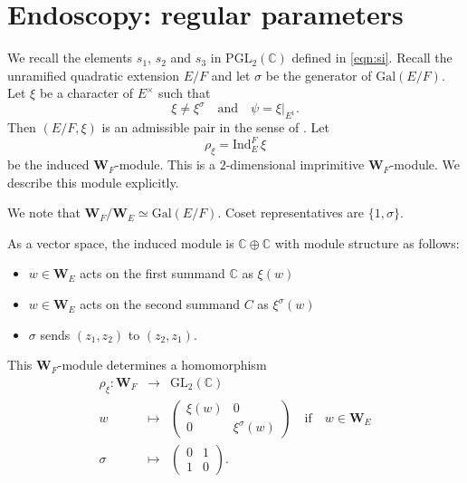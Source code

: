 \documentclass[11pt]{amsart}
\numberwithin{equation}{section}
\def\Gal{\mathrm{Gal}}
\def\Ind{\mathrm{Ind}}
\def\PGL{\mathrm{PGL}}
\def\GL{\mathrm{GL}}
\def\C{\mathbb{C}}
\def\W{\mathbf{W}}
\newcommand{\<}{\left\langle}
\renewcommand{\>}{\right\rangle}
\begin{document}
  
\section{Endoscopy: regular parameters}  
 We recall the elements $s_1$, $s_2$ and $s_3$ in $\PGL_2(\C)$ defined in \eqref{eqn:si}.
Recall the unramified quadratic extension  $E/F$ and  
let $\sigma$ be the generator of $\Gal(E/F)$.  Let $\xi$ be a character of $E^\times$ such that 
\[
\xi \neq \xi^\sigma \quad \textrm{and} \quad \psi = \xi|_{E^1}.
\] 
Then $(E/F, \xi)$ is an admissible pair in the sense of \cite[\S18]{BH}.   Let 
\[
\rho_\xi = \Ind_E^F \, \xi
\]
be the induced $\W_F$-module.   This is a $2$-dimensional imprimitive $\W_F$-module.    We describe this module explicitly.

We note that $\W_F/\W_E \simeq \Gal(E/F)$.   Coset representatives are $\{1, \sigma\}$.   

As a vector space, the induced module is $\C \oplus \C$ with module structure as follows:
\begin{itemize}
\item $w \in \W_E$ acts on the first summand $\C$ as $\xi(w)$ 
\item $w \in \W_E$ acts on the second summand $C$ as $\xi^\sigma(w)$
\item $\sigma$ sends $(z_1, z_2)$ to $(z_2, z_1)$.
\end{itemize}
This $\W_F$-module determines a homomorphism
\begin{eqnarray*}
\rho_\xi \colon\W_F &\to& \GL_2(\C)\\
w &\mapsto& \left(\begin{array}{cc} \xi(w) & 0 \\
0 & \xi^\sigma(w)
\end{array}
\right)\quad \textrm{if} \quad w \in \W_E\\
\sigma &\mapsto& \left(\begin{array}{cc}
0 & 1\\
1 & 0
\end{array}
\right).
\end{eqnarray*}
\end{document}
